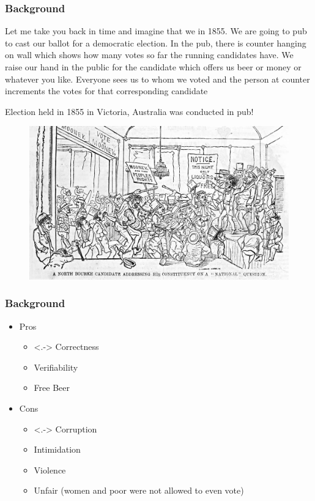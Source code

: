 \documentclass{beamer}
\begin{document}
%
%


\begin{frame}
\frametitle{Background}
{Let me take you back in time and imagine that 
we in 1855. We are going to pub to cast our ballot for a democratic election. 
In the pub, there is counter hanging on wall which shows how many votes 
so far the running  candidates have. 
We raise our hand in the public for the candidate which offers us
beer or money or whatever you like. Everyone sees us to whom we 
voted and the person at counter increments the votes for 
that corresponding candidate}

{Election held in 1855 in Victoria, Australia 
	  was conducted in pub!}
\begin{figure}
	\begin{center}
	\includegraphics[scale=0.20]{NorthBourke.jpg}
	\end{center}
  \end{figure}   
\end{frame}

\begin{frame}
\frametitle{Background}
\begin{itemize}[]
\item Pros 
\begin{itemize}
\item<.-> Correctness
\item Verifiability
\item Free Beer
\end{itemize}
\item Cons
\begin{itemize}
\item<.-> Corruption
\item Intimidation
\item Violence
\item Unfair (women and poor were not allowed to even vote)
\end{itemize}
\end{itemize}
\end{frame}
\end{document}
